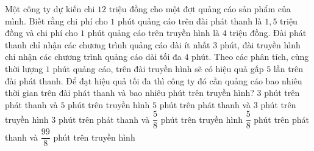 \begin{ex}%
	Một công ty dự kiến chi $12$ triệu đồng cho một đợt quảng cáo sản phẩm của mình. Biết rằng chi phí cho $1$ phút quảng cáo trên đài phát thanh là $1{,}5$ triệu đồng và chi phí cho $1$ phút quảng cáo trên truyền hình là $4$ triệu đồng. Đài phát thanh chỉ nhận các chương trình quảng cáo dài ít  nhất $3$ phút, đài truyền hình chỉ nhận các chương trình quảng cáo dài tối đa $4$ phút. Theo các phân tích, cùng thời lượng $1$ phút quảng cáo, trên đài truyền hình sẽ có hiệu quả gấp $5$ lần trên đài phát thanh. Để đạt hiệu quả tối đa thì công ty đó cần quảng cáo bao nhiêu thời gian trên đài phát thanh và bao nhiêu phút trên truyền hình?
	 \choice
		{$3$ phút trên phát thanh  và $5$ phút trên truyền hình}
		 {$5$ phút trên phát thanh và $3$ phút trên truyền hình}
		{\True $3$ phút trên phát  thanh và $\dfrac{5}{8}$ phút trên truyền hình}
		{$\dfrac{5}{8}$ phút trên phát  thanh và $\dfrac{99}{8}$ phút trên truyền hình}
\end{ex}

